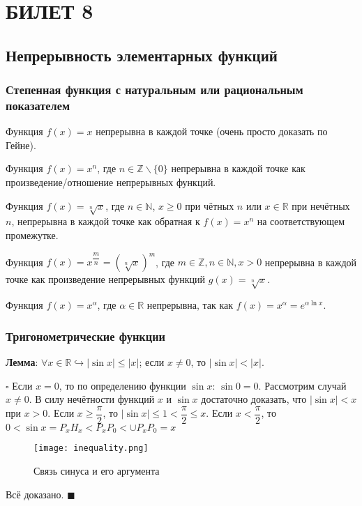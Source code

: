 \documentclass[12pt, a4paper, reqno]{article}
\begin{document}
\newpage
\section{БИЛЕТ 8}

\subsection{Непрерывность элементарных функций}

\subsubsection{Степенная функция с натуральным или рациональным показателем}

    Функция $f(x) = x$ непрерывна в каждой точке (очень просто доказать по Гейне).

    Функция $f(x) = x^n$, где $n\in\mathbb{Z}\backslash\{0\}$ непрерывна в каждой точке как
    произведение/отношение непрерывных функций.

    Функция $f(x) = \sqrt[n]{x}$, где $n\in\mathbb{N}$, $x \geq 0$ при чётных $n$ или
    $x\in\mathbb{R}$ при нечётных $n$, непрерывна в каждой точке как обратная к $f(x) = x^n$ на
    соответствующем промежутке.

    Функция $f(x) = x^{\dfrac{m}{n}} = (\sqrt[n]{x})^m$, где $m\in\mathbb{Z}, n\in\mathbb{N}, x > 0$
    непрерывна в каждой точке как произведение непрерывных функций $g(x) = \sqrt[n]{x}$.

    Функция $f(x) = x^\alpha$, где $\alpha\in\mathbb{R}$ непрерывна, так как $f(x) = x^\alpha =
    e^{\alpha \ln{x}}$.

\subsubsection{Тригонометрические функции}

    \textbf{Лемма}: $\forall x\in\mathbb{R}\hookrightarrow |\sin{x}| \leq |x|$; если $x\neq 0$, то
    $|\sin{x}| < |x|$.

    $\square$ Если $x = 0$, то по определению функции $\sin{x}$: $\sin{0} = 0$. Рассмотрим случай
    $x\neq 0$. В силу нечётности функций $x$ и $\sin{x}$ достаточно доказать, что $|\sin{x}| < x$
    при $x > 0$. Если $x \geq \dfrac{\pi}{2}$, то $|\sin{x}| \leq 1 < \dfrac{\pi}{2} \leq x$. Если
    $x < \dfrac{\pi}{2}$, то $0 < \sin{x} = P_xH_x < P_xP_0 < \cup P_xP_0 = x$
    \begin{figure}[H]
        \centering
        \texttt{[image: inequality.png]}
        \caption{Связь синуса и его аргумента}
    \end{figure}
    Всё доказано. $\blacksquare$
\end{document}
